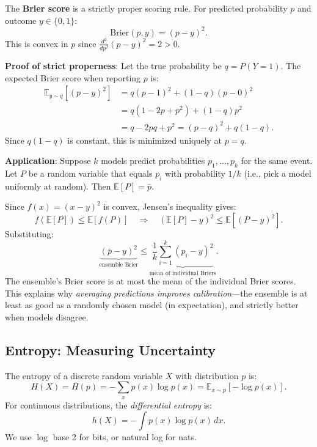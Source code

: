 \begin{example}
    The \textbf{Brier score} is a strictly proper scoring rule. For predicted probability $p$ and outcome $y \in \{0, 1\}$:
    \[
        \text{Brier}(p, y) = (p - y)^2.
    \]
    This is convex in $p$ since $\frac{d^2}{dp^2}(p - y)^2 = 2 > 0$.

    \textbf{Proof of strict properness}: Let the true probability be $q = P(Y = 1)$. The expected Brier score when reporting $p$ is:
    \begin{align*}
        \mathbb{E}_{y \sim q}[(p - y)^2] & = q(p - 1)^2 + (1-q)(p - 0)^2           \\
                                         & = q(1 - 2p + p^2) + (1-q)p^2            \\
                                         & = q - 2pq + p^2 = (p - q)^2 + q(1 - q).
    \end{align*}
    Since $q(1-q)$ is constant, this is minimized uniquely at $p = q$.

    \textbf{Application}: Suppose $k$ models predict probabilities $p_1, \ldots, p_k$ for the same event. Let $P$ be a random variable that equals $p_i$ with probability $1/k$ (i.e., pick a model uniformly at random). Then $\mathbb{E}[P] = \bar{p}$.

    Since $f(x) = (x - y)^2$ is convex, Jensen's inequality gives:
    \[
        f(\mathbb{E}[P]) \leq \mathbb{E}[f(P)] \quad \Longrightarrow \quad (\mathbb{E}[P] - y)^2 \leq \mathbb{E}[(P - y)^2].
    \]
    Substituting:
    \[
        \underbrace{(\bar{p} - y)^2}_{\text{ensemble Brier}} \leq \underbrace{\frac{1}{k}\sum_{i=1}^{k} (p_i - y)^2}_{\text{mean of individual Briers}}.
    \]
    The ensemble's Brier score is at most the mean of the individual Brier scores. This explains why \emph{averaging predictions improves calibration}---the ensemble is at least as good as a randomly chosen model (in expectation), and strictly better when models disagree.
\end{example}

\subsection{Entropy: Measuring Uncertainty}

\begin{definition}[Entropy]
    The entropy of a discrete random variable $X$ with distribution $p$ is:
    \[
        H(X) = H(p) = -\sum_{x} p(x) \log p(x) = \mathbb{E}_{x \sim p}\left[ -\log p(x) \right].
    \]
    For continuous distributions, the \emph{differential entropy} is:
    \[
        h(X) = -\int p(x) \log p(x) \, dx.
    \]
    We use $\log$ base 2 for bits, or natural log for nats.
\end{definition}

